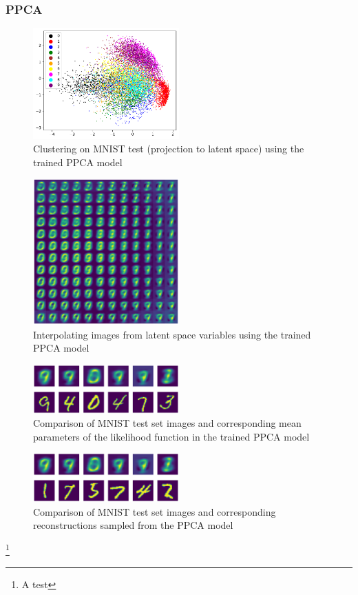 \subsubsection{PPCA}
\begin{figure}[H]
	\centering
	\includegraphics[width = 0.5\textwidth]{figures/ppca/clustering}
	\caption{Clustering on MNIST test (projection to latent space) using the trained PPCA model}
	\label{fig:ppca:clustering}
\end{figure}
\begin{figure}[H]
	\centering
	\includegraphics[width = 0.5\textwidth]{figures/ppca/interpolation}
	\caption{Interpolating images from latent space variables using the trained PPCA model}
	\label{fig:ppca:interpolation}
\end{figure}
\begin{figure}[H]
	\centering
	\includegraphics[width = 0.5\textwidth]{figures/ppca/mean_vs_real}
	\caption{Comparison of MNIST test set images and corresponding mean parameters of the likelihood function in the trained PPCA model}
	\label{fig:ppca:mean_v_real}
\end{figure}
\begin{figure}[H]
	\centering
	\includegraphics[width = 0.5\textwidth]{figures/ppca/sample_vs_real}
	\caption{Comparison of MNIST test set images and corresponding reconstructions sampled from the PPCA model}
	\label{fig:ppca:sample_v_real}
\end{figure}

\footnote{A test}
\citep{bishop2006pattern}



